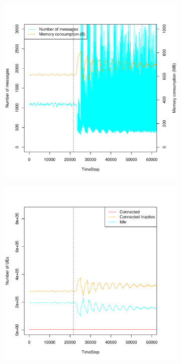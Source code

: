 \documentclass[a4j]{ujarticle}
\begin{document}
\begin{figure}[htbp]
\begin{subfigure}{0.49\hsize}
   \label{subfig:scenario_6_idleTimer_86400_345600_1-8_0-00045_1800_0_ideal}
 \end{subfigure}
 \par\bigskip %
 \begin{subfigure}{0.49\hsize}
   \centering
   \includegraphics[width=1.0\hsize]{scenario_6_signaling_and_memoryload_vs_timeStep_86400_345600_1-8_0-00045_1800_0_ideal.pdf}
   \label{subfig:scenario_6_signaling_and_memoryload_vs_timeStep_86400_345600_1-8_0-00045_1800_0_ideal}
 \end{subfigure}
 \begin{subfigure}{0.49\hsize}
   \centering
   \includegraphics[width=1.0\hsize]{scenario_6_stateBreakdown_86400_345600_1-8_0-00045_1800_0_ideal.pdf}

\end{subfigure}
\end{figure}
\end{document}
